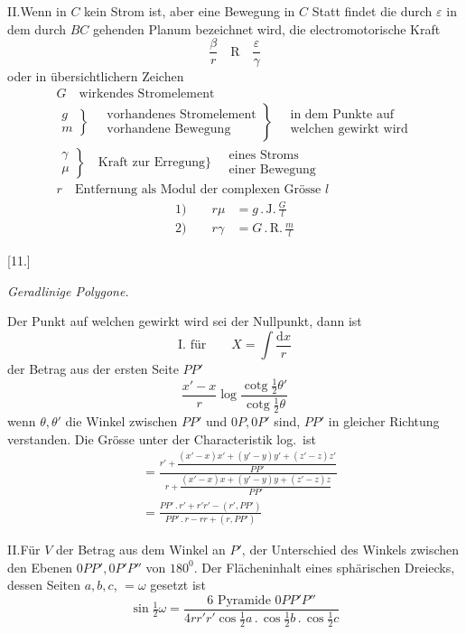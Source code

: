 II.\quad Wenn in $C$ kein Strom ist, aber eine Bewegung in $C$ Statt findet die durch $\varepsilon$ in dem durch $BC$ gehenden Planum bezeichnet wird, die electromotorische Kraft
\[
\frac{\beta}{r}\quad\mathrm R\quad\frac{\varepsilon}{\gamma}
\]
oder in übersichtlichern Zeichen
\[
\begin{gathered}
G\quad\text{wirkendes Stromelement}\\[4pt]
\left.\begin{gathered}g\\m\end{gathered}\right\}\quad
\left.\begin{gathered}\text{vorhandenes Stromelement}\\\text{vorhandene Bewegung}\end{gathered}\right\}\quad
\begin{gathered}\text{in dem Punkte auf}\\\text{welchen gewirkt wird}\end{gathered}\\[4pt]
\left.\begin{gathered}\gamma\\\mu\end{gathered}\right\}\quad
\text{Kraft zur Erregung}\Bigg\}\quad
\begin{gathered}\text{eines Stroms}\\\text{einer Bewegung}\end{gathered}\\[4pt]
r\quad\text{Entfernung als Modul der complexen Grösse }l
\end{gathered}
\]
\[
\begin{aligned}
\text{1)}\qquad r\mu&=g\,.\,\mathrm{J.}\,\frac{G}{l}\\[4pt]
\text{2)}\qquad r\gamma&=G\,.\,\mathrm{R.}\,\frac{m}{l}
\end{aligned}
\]

\begin{center}[11.]\par\medskip\textit{Geradlinige Polygone.}\end{center}
Der Punkt auf welchen gewirkt wird sei der Nullpunkt, dann ist
\[
\text{I. für}\qquad X=\int\frac{\mathrm dx}{r}
\]
der Betrag aus der ersten Seite $PP'$
\[
\frac{x'-x}{r}\log\frac{\operatorname{cotg}\tfrac{1}{2}\theta'}{\operatorname{cotg}\tfrac{1}{2}\theta}
\]
wenn $\theta,\theta'$ die Winkel zwischen $PP'$ und $0P,0P'$ sind, $PP'$ in gleicher Richtung verstanden. Die Grösse unter der Characteristik log.\ ist
\[
\begin{aligned}
&=\frac{r'+\dfrac{(x'-x)x'+(y'-y)y'+(z'-z)z'}{PP'}}{r+\dfrac{(x'-x)x+(y'-y)y+(z'-z)z}{PP'}}\\[6pt]
&=\frac{PP'\,.\,r'+r'r'-(r',PP')}{PP'\,.\,r-rr+(r,PP')}
\end{aligned}
\]

II.\quad Für $V$ der Betrag aus dem Winkel an $P'$, der Unterschied des Winkels zwischen den Ebenen $0PP',0P'P''$ von $180^0$. Der Flächeninhalt eines sphärischen Dreiecks, dessen Seiten $a,b,c$, $=\omega$ gesetzt ist
\[
\sin\tfrac{1}{2}\omega=\frac{6\text{ Pyramide }0PP'P''}{4rr'r'\cos\tfrac{1}{2}a\,.\,\cos\tfrac{1}{2}b\,.\,\cos\tfrac{1}{2}c}
\]
